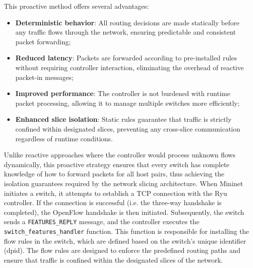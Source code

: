 This proactive method offers several advantages:
\begin{itemize}
    \item \textbf{Deterministic behavior}: All routing decisions are made statically before any traffic flows through the network, ensuring predictable and consistent packet forwarding;
    \item \textbf{Reduced latency}: Packets are forwarded according to pre-installed rules without requiring controller interaction, eliminating the overhead of reactive packet-in messages;
    \item \textbf{Improved performance}: The controller is not burdened with runtime packet processing, allowing it to manage multiple switches more efficiently;
    \item \textbf{Enhanced slice isolation}: Static rules guarantee that traffic is strictly confined within designated slices, preventing any cross-slice communication regardless of runtime conditions.
\end{itemize}

\noindent
Unlike reactive approaches where the controller would process unknown flows dynamically, this proactive strategy ensures that every switch has complete knowledge of how to forward packets for all host pairs, thus achieving the isolation guarantees required by the network slicing architecture.
When Mininet initiates a switch, it attempts to establish a TCP connection with the Ryu controller. If the connection is successful (i.e. the three-way handshake is completed), the OpenFlow handshake is then initiated. Subsequently, the switch sends a \lstinline|FEATURES_REPLY| message, and the controller executes the \lstinline|switch_features_handler| function.
This function is responsible for installing the flow rules in the switch, which are defined based on the switch's unique identifier (dpid). The flow rules are designed to enforce the predefined routing paths and ensure that traffic is confined within the designated slices of the network.


